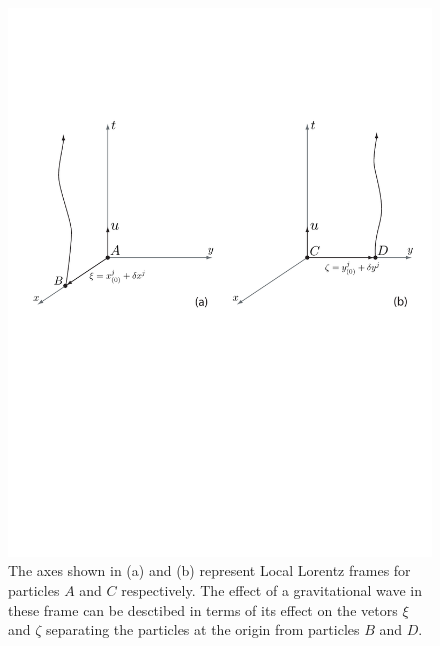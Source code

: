 \begin{figure}[p]
\label{f:particles}
\begin{center}
\includegraphics[width=\linewidth]{figures/inspiral/deviation}
\end{center}
\caption[Effect of a Gravitational Wave on Test Particles]{%
The axes shown in (a) and (b) represent Local Lorentz frames for particles $A$
and $C$ respectively. The effect of a gravitational wave in these frame can be
desctibed in terms of its effect on the vetors $\xi$ and $\zeta$ separating
the particles at the origin from particles $B$ and $D$.
}
\end{figure}

